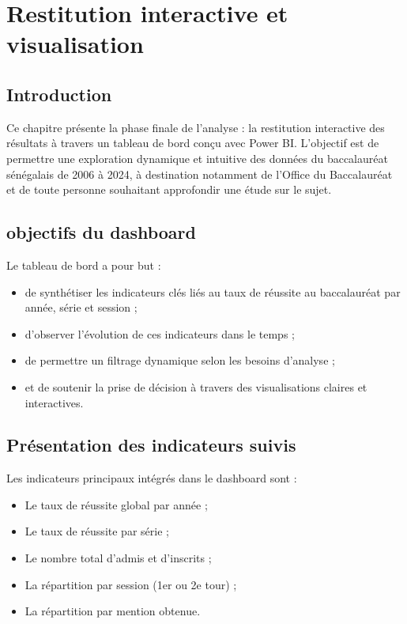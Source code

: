 \chapter{Restitution interactive et visualisation}

\section{Introduction}

Ce chapitre présente la phase finale de l’analyse : la restitution interactive des résultats à travers un tableau de bord conçu avec Power BI. 
L’objectif est de permettre une exploration dynamique et intuitive des données du baccalauréat sénégalais de 2006 à 2024, 
à destination notamment de l’Office du Baccalauréat et de toute personne souhaitant approfondir une étude sur le sujet.

\section{objectifs du dashboard}

Le tableau de bord a pour but :

\begin{itemize}
    \item de synthétiser les indicateurs clés liés au taux de réussite au baccalauréat par année, série et session ;
    \item d’observer l’évolution de ces indicateurs dans le temps ;
    \item de permettre un filtrage dynamique selon les besoins d’analyse ;
    \item et de soutenir la prise de décision à travers des visualisations claires et interactives.
\end{itemize}

\section{Présentation des indicateurs suivis}

Les indicateurs principaux intégrés dans le dashboard sont :
\begin{itemize}
    \item Le taux de réussite global par année ;
    \item Le taux de réussite par série ;
    \item Le nombre total d’admis et d’inscrits ;
    \item La répartition par session (1er ou 2e tour) ;
    \item La répartition par mention obtenue.
\end{itemize}


